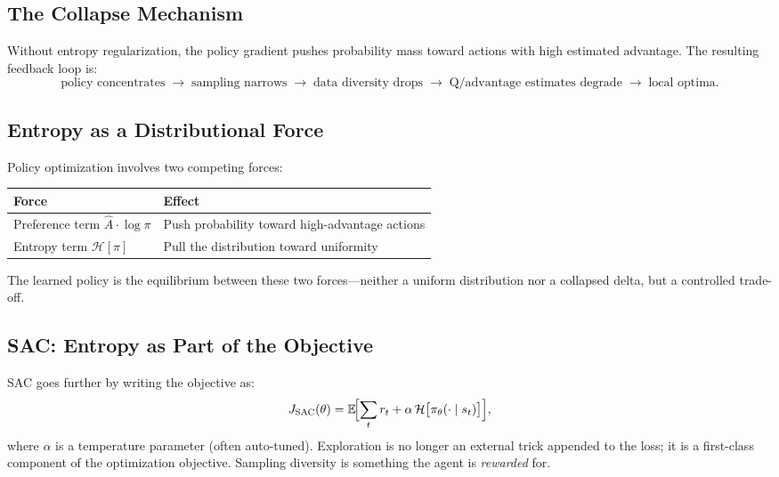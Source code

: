 \subsection{The Collapse Mechanism}

Without entropy regularization, the policy gradient pushes probability mass toward actions with high estimated advantage. The resulting feedback loop is:
\begin{equation*}
  \text{policy concentrates}
  \;\to\; \text{sampling narrows}
  \;\to\; \text{data diversity drops}
  \;\to\; \text{Q/advantage estimates degrade}
  \;\to\; \text{local optima.}
\end{equation*}

\subsection{Entropy as a Distributional Force}

Policy optimization involves two competing forces:

\begin{center}
\begin{tabular}{@{} l l @{}}
\toprule
\textbf{Force} & \textbf{Effect} \\
\midrule
Preference term $\hat{A}\cdot\log\pi$ & Push probability toward high-advantage actions \\
Entropy term $\mathcal{H}[\pi]$ & Pull the distribution toward uniformity \\
\bottomrule
\end{tabular}
\end{center}

The learned policy is the equilibrium between these two forces---neither a uniform distribution nor a collapsed delta, but a controlled trade-off.

\subsection{SAC: Entropy as Part of the Objective}

SAC goes further by writing the objective as:
\begin{equation}
  J_{\text{SAC}}(\theta) = \mathbb{E}\!\Bigl[\sum_t r_t + \alpha\,\mathcal{H}\bigl[\pi_\theta(\cdot \mid s_t)\bigr]\Bigr],
  \label{eq:sac-obj}
\end{equation}
where $\alpha$ is a temperature parameter (often auto-tuned). Exploration is no longer an external trick appended to the loss; it is a first-class component of the optimization objective. Sampling diversity is something the agent is \emph{rewarded} for.

